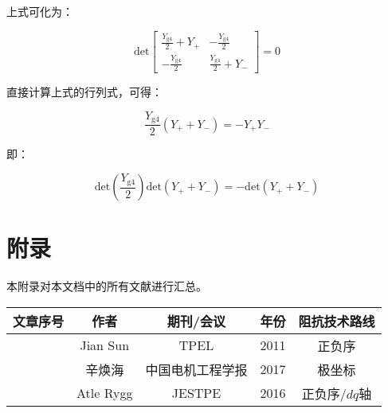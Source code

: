 \documentclass[12pt, a4paper, UTF8, fontset=adobe, scheme=chinese, heading=true, oneside]{ctexbook} %
\begin{document}
上式可化为：

\begin{equation}
  \mathrm{det} 
    \begin{bmatrix}
      \frac{Y_{\mathrm{g4}}}{2}+Y_{+} & -\frac{Y_{\mathrm{g4}}}{2} \\ 
      -\frac{Y_{\mathrm{g4}}}{2} & \frac{Y_{\mathrm{g4}}}{2}+Y_{-}
    \end{bmatrix} = 0
\end{equation}

直接计算上式的行列式，可得：

\begin{equation}
  \frac{Y_{\mathrm{g4}}}{2} \left( Y_{+}+Y_{-} \right) = -Y_{+}Y_{-}
\end{equation}

即：

\begin{equation}
  \mathrm{det}\left( \frac{Y_{\mathrm{g4}}}{2} \right) \mathrm{det}\left( Y_{+}+Y_{-} \right)
  = - \mathrm{det}\left( Y_{+}+Y_{-} \right)
\end{equation}

\chapter*{附录}

本附录对本文档中的所有文献进行汇总。

\begin{table}[htbp]
  \centering
  \begin{tabular}{ccccc}
    \toprule
    文章序号 & 作者 & 期刊/会议 & 年份 & 阻抗技术路线 \\
    \midrule
    \cite{sun2011} & Jian Sun & TPEL & 2011 & 正负序 \\
    \cite{xin2017} & 辛焕海 & 中国电机工程学报 & 2017 & 极坐标 \\
    \cite{rygg2016} & Atle Rygg & JESTPE & 2016 & 正负序/$dq$轴 \\
    \bottomrule
  \end{tabular}
\end{table}




\end{document}
